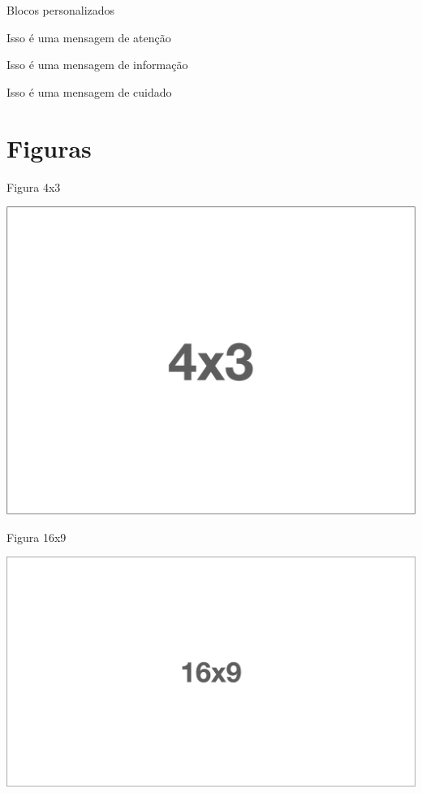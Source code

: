 \documentclass{beamer}
\begin{document}
\begin{frame}{Blocos personalizados}
\begin{atencao}
    Isso é uma mensagem de atenção
\end{atencao}
\begin{informacao}
    Isso é uma mensagem de informação
\end{informacao}
\begin{cuidado}
    Isso é uma mensagem de cuidado
\end{cuidado}

\end{frame}

\section{Figuras}

\begin{frame}{Figura 4x3}
    \begin{center}
        \includegraphics[width=.8\linewidth]{figs/4x3.png}
    \end{center}
\end{frame}
    

\begin{frame}{Figura 16x9}
\begin{center}
    \includegraphics[width=\linewidth]{figs/16x9.png}
\end{center}
\end{frame}
\end{document}
